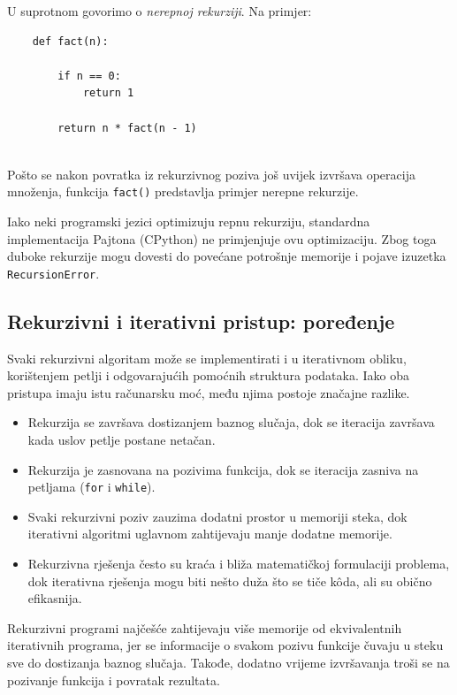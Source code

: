 U suprotnom govorimo o \textit{nerepnoj rekurziji}. Na primjer:

\begin{verbatim}
	def fact(n):
	
	    if n == 0:
	        return 1
	
	    return n * fact(n - 1)
	
\end{verbatim}

Pošto se nakon povratka iz rekurzivnog poziva još uvijek izvršava operacija množenja, funkcija \texttt{fact()} predstavlja primjer nerepne rekurzije.

Iako neki programski jezici optimizuju repnu rekurziju, standardna implementacija Pajtona (CPython) ne primjenjuje ovu optimizaciju. Zbog toga duboke rekurzije mogu dovesti do povećane potrošnje memorije i pojave izuzetka \texttt{RecursionError}.

 
\subsection{Rekurzivni i iterativni pristup: poređenje}

Svaki rekurzivni algoritam može se implementirati i u iterativnom obliku, korištenjem petlji i odgovarajućih pomoćnih struktura podataka. Iako oba pristupa imaju istu računarsku moć, među njima postoje značajne razlike.

\begin{itemize}
	\item Rekurzija se završava dostizanjem baznog slučaja, dok se iteracija završava kada uslov petlje postane netačan.
	
	\item Rekurzija je zasnovana na pozivima funkcija, dok se iteracija zasniva na petljama (\texttt{for} i \texttt{while}).
	
	\item Svaki rekurzivni poziv zauzima dodatni prostor u memoriji steka, dok iterativni algoritmi uglavnom zahtijevaju manje dodatne memorije.
	
	\item Rekurzivna rješenja često su kraća i bliža matematičkoj formulaciji problema, dok iterativna rješenja mogu biti nešto duža što se tiče k\^oda, ali su obično efikasnija.	
\end{itemize}

Rekurzivni programi najčešće zahtijevaju više memorije od ekvivalentnih iterativnih programa, jer se informacije o svakom pozivu funkcije čuvaju u steku sve do dostizanja baznog slučaja. Takođe, dodatno vrijeme izvršavanja troši se na pozivanje funkcija i povratak rezultata.

